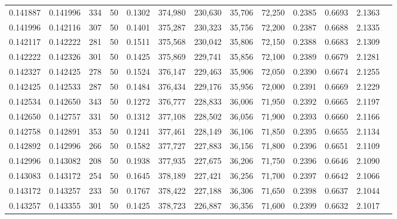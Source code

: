 \begin{tabular}{rrrrrrrrrrrrr}
0.141887 & 0.141996 &   334 &  50 &                                     0.1302 & 374,980 & 230,630 &  35,706 &  72,250 & 0.2385 & 0.6693 & 2.1363 \\
0.141996 & 0.142116 &   307 &  50 &                                     0.1401 & 375,287 & 230,323 &  35,756 &  72,200 & 0.2387 & 0.6688 & 2.1335 \\
0.142117 & 0.142222 &   281 &  50 &                                     0.1511 & 375,568 & 230,042 &  35,806 &  72,150 & 0.2388 & 0.6683 & 2.1309 \\
0.142222 & 0.142326 &   301 &  50 &                                     0.1425 & 375,869 & 229,741 &  35,856 &  72,100 & 0.2389 & 0.6679 & 2.1281 \\
0.142327 & 0.142425 &   278 &  50 &                                     0.1524 & 376,147 & 229,463 &  35,906 &  72,050 & 0.2390 & 0.6674 & 2.1255 \\
0.142425 & 0.142533 &   287 &  50 &                                     0.1484 & 376,434 & 229,176 &  35,956 &  72,000 & 0.2391 & 0.6669 & 2.1229 \\
0.142534 & 0.142650 &   343 &  50 &                                     0.1272 & 376,777 & 228,833 &  36,006 &  71,950 & 0.2392 & 0.6665 & 2.1197 \\
0.142650 & 0.142757 &   331 &  50 &                                     0.1312 & 377,108 & 228,502 &  36,056 &  71,900 & 0.2393 & 0.6660 & 2.1166 \\
0.142758 & 0.142891 &   353 &  50 &                                     0.1241 & 377,461 & 228,149 &  36,106 &  71,850 & 0.2395 & 0.6655 & 2.1134 \\
0.142892 & 0.142996 &   266 &  50 &                                     0.1582 & 377,727 & 227,883 &  36,156 &  71,800 & 0.2396 & 0.6651 & 2.1109 \\
0.142996 & 0.143082 &   208 &  50 &                                     0.1938 & 377,935 & 227,675 &  36,206 &  71,750 & 0.2396 & 0.6646 & 2.1090 \\
0.143083 & 0.143172 &   254 &  50 &                                     0.1645 & 378,189 & 227,421 &  36,256 &  71,700 & 0.2397 & 0.6642 & 2.1066 \\
0.143172 & 0.143257 &   233 &  50 &                                     0.1767 & 378,422 & 227,188 &  36,306 &  71,650 & 0.2398 & 0.6637 & 2.1044 \\
0.143257 & 0.143355 &   301 &  50 &                                     0.1425 & 378,723 & 226,887 &  36,356 &  71,600 & 0.2399 & 0.6632 & 2.1017 \\

\end{tabular}
